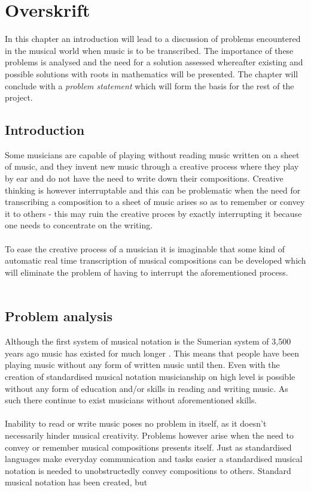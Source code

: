 \chapter{Overskrift} \label{ch1}
In this chapter an introduction will lead to a discussion of problems encountered in the musical world when music is to be transcribed. The importance of these problems is analysed and the need for a solution assessed whereafter existing and possible solutions with roots in mathematics will be presented. The chapter will conclude with a \textit{problem statement} which will form the basis for the rest of the project.
\section{Introduction}
Some musicians are capable of playing without reading music written on a sheet of music, and they invent new music through a creative process where they play by ear and do not have the need to write down their compositions. Creative thinking is however interruptable and this can be problematic when the need for transcribing a composition to a sheet of music arises so as to remember or convey it to others - this may ruin the creative proces by exactly interrupting it because one needs to concentrate on the writing.\\\\
To ease the creative process of a musician it is imaginable that some kind of automatic real time transcription of musical compositions can be developed which will eliminate the problem of having to interrupt the aforementioned process.\\\\
\section{Problem analysis}
Although the first system of musical notation is the Sumerian system of 3,500 years ago music has existed for much longer \cite{origins}. This means that people have been playing music without any form of written music until then. Even with the creation of standardised musical notation musicianship on high level is possible without any form of education and/or skills in reading and writing music. As such there continue to exist musicians without aforementioned skills.\\\\
Inability to read or write music poses no problem in itself, as it doesn't necessarily hinder musical creativity. Problems however arise when the need to convey or remember musical compositions presents itself. Just as standardised languages make everyday communication and tasks easier a standardised musical notation is needed to unobstructedly convey compositions to others. Standard musical notation has been created, but
%
